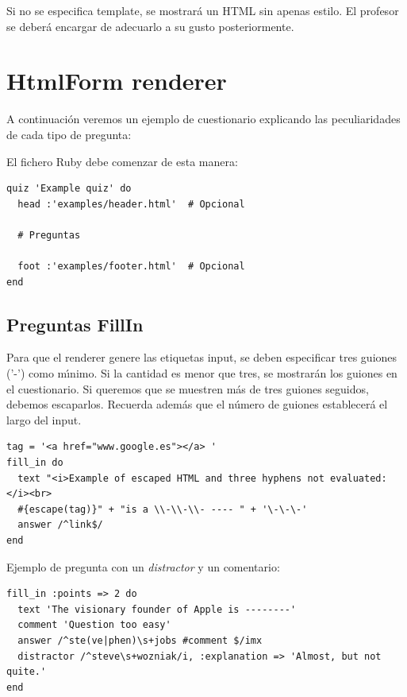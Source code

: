

Si no se especifica template, se mostrar\'a un HTML sin apenas estilo. El profesor se deber\'a encargar de adecuarlo a su gusto posteriormente. 

\section{HtmlForm renderer}
\label{Apendice2:htmlform}

A continuaci\'on veremos un ejemplo de cuestionario explicando las peculiaridades de cada tipo de pregunta:

El fichero Ruby debe comenzar de esta manera:
\begin{verbatim}
quiz 'Example quiz' do
  head :'examples/header.html'  # Opcional
  
  # Preguntas
  
  foot :'examples/footer.html'  # Opcional
end
\end{verbatim}
\bigskip

\subsection{Preguntas FillIn}
\label{subsec:Apendice2.1}

Para que el renderer genere las etiquetas input, se deben especificar tres guiones ('-') como m\'{\i}nimo. Si la cantidad es menor que tres, se mostrar\'an los guiones
en el cuestionario. Si queremos que se muestren m\'as de tres guiones seguidos, debemos escaparlos. Recuerda adem\'as que el n\'umero de guiones establecer\'a el largo del input.
\begin{verbatim}
tag = '<a href="www.google.es"></a> '
fill_in do
  text "<i>Example of escaped HTML and three hyphens not evaluated:</i><br> 
  #{escape(tag)}" + "is a \\-\\-\\- ---- " + '\-\-\-'
  answer /^link$/
end
\end{verbatim}
\bigskip

Ejemplo de pregunta con un \textit{distractor} y un comentario:
\begin{verbatim}
fill_in :points => 2 do
  text 'The visionary founder of Apple is --------'
  comment 'Question too easy'
  answer /^ste(ve|phen)\s+jobs #comment $/imx
  distractor /^steve\s+wozniak/i, :explanation => 'Almost, but not quite.'
end
\end{verbatim}
\bigskip

